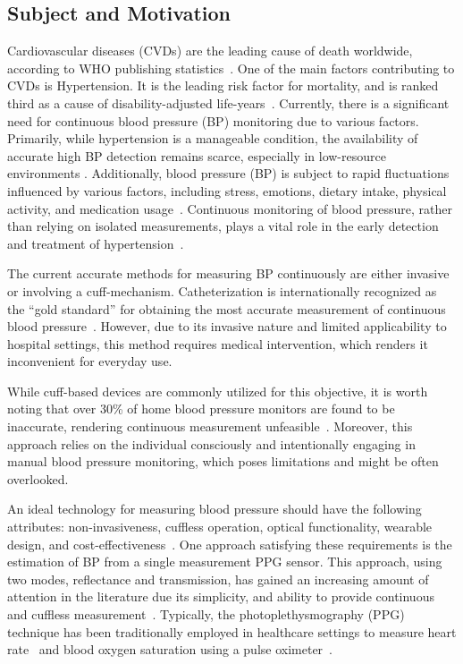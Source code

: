\subsection{Subject and Motivation}
\label{subsec:subject_motivation}

Cardiovascular diseases (CVDs) are the leading cause of death worldwide, according to WHO publishing statistics~\cite{organizationWorldHealthStatistics2023}.
One of the main factors contributing to CVDs is Hypertension.
It is the leading risk factor for mortality, and is ranked third as a cause of disability-adjusted life-years~\cite{ezzatiSelectedMajorRisk2002}.
Currently, there is a significant need for continuous blood pressure (BP) monitoring due to various factors.
Primarily, while hypertension is a manageable condition, the availability of accurate high BP detection remains scarce, especially in low-resource environments \cite{burtPrevalenceHypertensionUS1995}.
Additionally, blood pressure (BP) is subject to rapid fluctuations influenced by various factors, including stress, emotions, dietary intake, physical activity, and medication usage~\cite{poonCufflessNoninvasiveMeasurements2005}.
Continuous monitoring of blood pressure, rather than relying on isolated measurements, plays a vital role in the early detection and treatment of hypertension~\cite{el-hajjDeepLearningModels2021}.

The current accurate methods for measuring BP continuously are either invasive or involving a cuff-mechanism.
Catheterization is internationally recognized as the \enquote{gold standard} for obtaining the most accurate measurement of continuous blood pressure~\cite{sharmaCuffLessContinuousBlood2017}.
However, due to its invasive nature and limited applicability to hospital settings, this method requires medical intervention, which renders it inconvenient for everyday use.

While cuff-based devices are commonly utilized for this objective, it is worth noting that over 30\% of home blood pressure monitors are found to be inaccurate, rendering continuous measurement unfeasible~\cite{leungHypertensionCanada20162016}.
Moreover, this approach relies on the individual consciously and intentionally engaging in manual blood pressure monitoring, which poses limitations and might be often overlooked.

An ideal technology for measuring blood pressure should have the following attributes: non-invasiveness, cuffless operation, optical functionality, wearable design, and cost-effectiveness~\cite{el-hajjDeepLearningModels2021}.
One approach satisfying these requirements is the estimation of BP from a single measurement PPG sensor.
This approach, using two modes, reflectance and transmission, has gained an increasing amount of attention in the literature due its simplicity, and ability to provide continuous and cuffless measurement~\cite{el-hajjDeepLearningModels2021}.
Typically, the photoplethysmography (PPG) technique has been traditionally employed in healthcare settings to measure heart rate~\cite{reyesWirelessPhotoplethysmographicDevice2012} and blood oxygen saturation using a pulse oximeter~\cite{yoonMultipleDiagnosisBased2002}.

